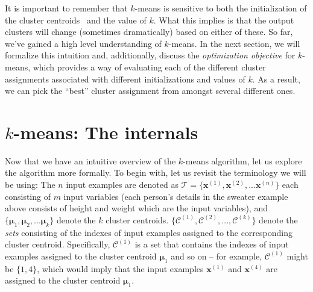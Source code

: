 It is important to remember that $k$-means is sensitive to both the initialization of the cluster centroids~\cite{CELEBI2013200} and the value of $k$. What this implies is that the output clusters will change (sometimes dramatically) based on either of these. So far, we've gained a high level understanding of $k$-means. In the next section, we will formalize this intuition and, additionally, discuss the \emph{optimization objective} for $k$-means, which provides a way of evaluating each of the different cluster assignments associated with different initializations and values of $k$. As a result, we can pick the ``best'' cluster assignment from amongst several different ones. 

\section{$k$-means: The internals}

Now that we have an intuitive overview of the $k$-means algorithm, let us explore the algorithm more formally. To begin with, let us revisit the terminology we will be using: The $n$ input examples are denoted as $\mathcal{T} = \{ \mathbf{x}^{(1)}, \mathbf{x}^{(2)}, ... \mathbf{x}^{(n)}\} $ each consisting of $m$ input variables (each person's details in the sweater example above consists of height and weight which are the input variables), and $\{ \bm{\mu}_1, \bm{\mu}_2, ... \bm{\mu}_k\}$ denote the $k$ cluster centroids.  $\{\mathcal{C}^{(1)}, \mathcal{C}^{(2)}, ..., \mathcal{C}^{(k)}\}$ denote the \emph{sets} consisting of the indexes of input examples assigned to the corresponding cluster centroid. Specifically, $\mathcal{C}^{(1)}$ is a set that contains the indexes of input examples assigned to the cluster centroid $\bm{\mu}_1$ and so on -- for example, $\mathcal{C}^{(1)}$ might be $\{ 1, 4\}$, which would imply that the input examples $\mathbf{x}^{(1)}$ and $\mathbf{x}^{(4)}$ are assigned to the cluster centroid $\bm{\mu}_1$. 

